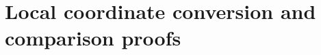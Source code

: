 \appendix
\renewcommand{\thesection}{A.\arabic{section}}
\renewcommand{\theHsection}{principal.appendix.\arabic{section}}
\part{Local coordinate conversion and comparison proofs}






